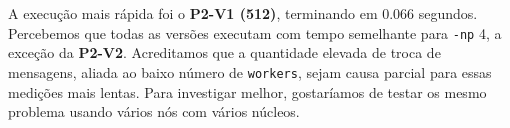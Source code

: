 \documentclass[12pt]{article}
\def\code#1{\texttt{#1}}
\begin{document}
A execução mais rápida foi o \textbf{P2-V1 (512)}, terminando em 0.066 segundos. Percebemos que todas as versões executam com tempo semelhante para \code{-np} 4, a exceção da \textbf{P2-V2}. Acreditamos que a quantidade elevada de troca de mensagens, aliada ao baixo número de \code{workers}, sejam causa parcial para essas medições mais lentas. Para investigar melhor, gostaríamos de testar os mesmo problema usando vários nós com vários núcleos.
\end{document}
